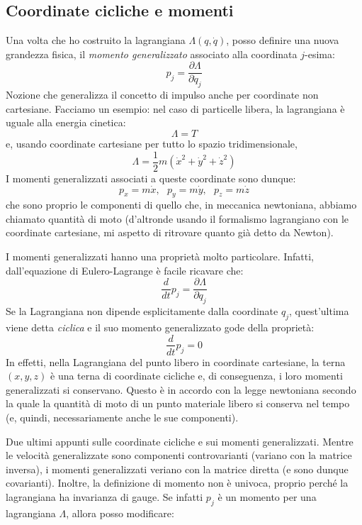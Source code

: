 \documentclass[a4paper,openany]{article}
\begin{document}
	\subsection{Coordinate cicliche e momenti}
	Una volta che ho costruito la lagrangiana $\Lambda(q,\dot{q})$, posso definire una nuova grandezza fisica, il \textit{momento generalizzato} associato alla coordinata $j$-esima:
	\begin{equation}
		p_{j} = \dfrac{\partial \Lambda}{\partial \dot{q}_{j}}
	\end{equation} 
	Nozione che generalizza il concetto di impulso anche per coordinate non cartesiane. Facciamo un esempio: nel caso di particelle libera, la lagrangiana è uguale alla energia cinetica:
	$$
	\Lambda = T
	$$
	e, usando coordinate cartesiane per tutto lo spazio tridimensionale,
	$$
	\Lambda = \dfrac{1}{2}m(\dot{x}^{2}+\dot{y}^{2}+\dot{z}^{2})
	$$
	I momenti generalizzati associati a queste coordinate sono dunque:
	$$
	p_{x} = m\dot{x}, \mbox{               } p_{y} = m\dot{y}, \mbox{              } p_{z} = m\dot{z}
	$$
	che sono proprio le componenti di quello che, in meccanica newtoniana, abbiamo chiamato quantità di moto (d'altronde usando il formalismo lagrangiano con le coordinate cartesiane, mi aspetto di ritrovare quanto già detto da Newton).
	
	I momenti generalizzati hanno una proprietà molto particolare. Infatti, dall'equazione di Eulero-Lagrange è facile ricavare che:
	\begin{equation}
		\dfrac{d}{dt}p_{j} = \dfrac{\partial \Lambda}{\partial q_{j}}
	\end{equation} 
	Se la Lagrangiana non dipende esplicitamente dalla coordinate $q_{j}$, quest'ultima viene detta \textit{ciclica} e il suo momento generalizzato gode della proprietà:
	$$
	\dfrac{d}{dt}p_{j} = 0
	$$
	In effetti, nella Lagrangiana del punto libero in coordinate cartesiane, la terna $(x,y,z)$ è una terna di coordinate cicliche e, di conseguenza, i loro momenti generalizzati si conservano. Questo è in accordo con la legge newtoniana secondo la quale la quantità di moto di un punto materiale libero si conserva nel tempo (e, quindi, necessariamente anche le sue componenti). 
	
	
	
	Due ultimi appunti sulle coordinate cicliche e sui momenti generalizzati. Mentre le velocità generalizzate sono componenti controvarianti (variano con la matrice inversa), i momenti generalizzati veriano con la matrice diretta (e sono dunque covarianti). Inoltre, la definizione di momento non è univoca, proprio perché la lagrangiana ha invarianza di gauge. Se infatti $p_{j}$ è un momento per una lagrangiana $\Lambda$, allora posso modificare:
	
\end{document}
